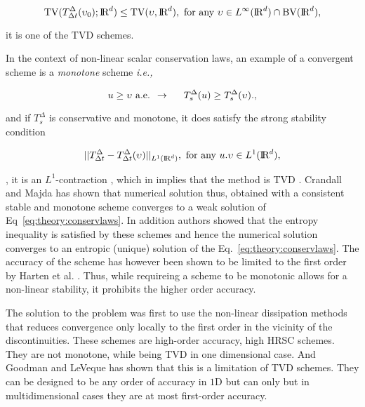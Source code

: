 \begin{equation}
\text{TV}(T_{\Delta t} ^{\Delta}(\upsilon_0); \text{I\!R}^d) \leq \text{TV}(\upsilon,  \text{I\!R}^d), \text{ for any } \upsilon\in L^{\infty}(\text{I\!R}^d)\cap \text{BV}(\text{I\!R}^d),
\end{equation}

it is one of the \ac{TVD} schemes. 

In the context of non-linear scalar conservation laws, an example of a convergent scheme is a \textit{monotone} scheme \textit{i.e.,}

\begin{equation}
u \geq \upsilon \text{ a.e. } \rightarrow \hspace{5mm} T_{s}^{\Delta}(u) \geq T_{s}^{\Delta}(\upsilon).,
\end{equation}

and if $T_{s}^{\Delta}$ is conservative and monotone, it does satisfy the strong stability condition 

\begin{equation}
|| T^{\Delta} _{\Delta t} - T^{\Delta} _{\Delta t}(\upsilon)||_{L^1(\text{I\!R}^d)}, \text{  for any  } u.\upsilon\in L^1(\text{I\!R}^d),
\end{equation}

\ie, it is an $L^1$-contraction \citep{Crandall:1980proc}, which in implies that the method is \ac{TVD} \citep{LeVeque:1992}. Crandall and Majda \citep{Crandall:1980} has shown that numerical solution thus, obtained with a consistent stable and monotone scheme converges to a weak solution of Eq~\eqref{eq:theory:conservlaws}. 
In addition authors showed that the entropy inequality is satisfied by these schemes and hence the numerical solution converges to an entropic (unique) solution of the Eq.~\eqref{eq:theory:conservlaws}. 
The accuracy of the scheme has however been shown to be limited to the first order by Harten et al. \citep{Harten:1976}. Thus, while requireing a scheme to be monotonic allows for a non-linear stability, it prohibits the higher order accuracy.

The solution to the problem was first to use the non-linear dissipation methods that reduces convergence only locally to the first order in the vicinity of the discontinuities. These schemes are high-order accuracy, high \ac{HRSC} schemes. They are not monotone, while being \ac{TVD} in one dimensional case. And Goodman and LeVeque \citep{Goodman:1985} has shown that this is a limitation of \ac{TVD} schemes. They can be designed to be any order of accuracy in $1$D but can only but in multidimensional cases they are at most first-order accuracy. 

